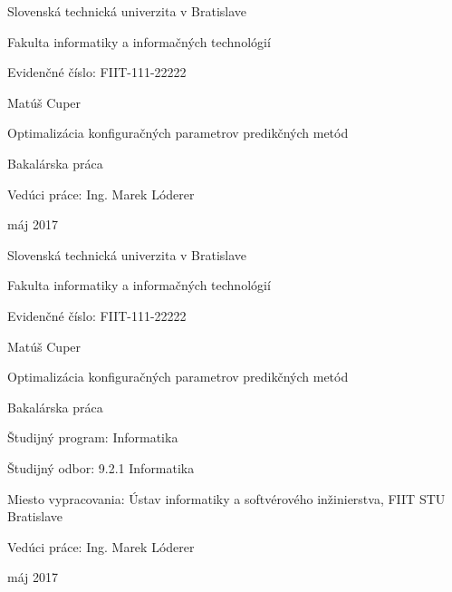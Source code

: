 \documentclass[a4paper,slovak,12pt,appendix]{article}
\begin{document}
\begin{titlepage}
	\centering
	{\Large Slovenská technická univerzita v Bratislave \par}
	{\Large Fakulta informatiky a informačných technológií \par}
  \vspace{0.5cm}
  {\normalsize Evidenčné číslo: FIIT-111-22222 \par}
	\vspace{7cm}
  {\large Matúš Cuper \par}
  \vspace{0.5cm}
	{\LARGE Optimalizácia konfiguračných parametrov predikčných metód \par}
	\vspace{0.5cm}
	{\large Bakalárska práca \par}
	\vspace{7cm}
  \flushleft
	{\large Vedúci práce: Ing. Marek Lóderer \par}
  \vspace{0.5cm}
  {\large máj 2017 \par}
	\vfill
\end{titlepage}

\begin{titlepage}
	\centering
  {\Large Slovenská technická univerzita v Bratislave \par}
	{\Large Fakulta informatiky a informačných technológií \par}
  \vspace{0.5cm}
  {\normalsize Evidenčné číslo: FIIT-111-22222 \par}
	\vspace{7cm}
  {\large Matúš Cuper \par}
  \vspace{0.5cm}
	{\LARGE Optimalizácia konfiguračných parametrov predikčných metód \par}
	\vspace{0.5cm}
	{\large Bakalárska práca \\}
	\vspace{7cm}
  \flushleft
  {\normalsize Študijný program: Informatika \par}
	{\normalsize Študijný odbor: 9.2.1 Informatika \par}
	{\normalsize Miesto vypracovania: Ústav informatiky a softvérového inžinierstva, FIIT STU Bratislave \par}
	{\normalsize Vedúci práce: Ing. Marek Lóderer \par}
  \vspace{0.5cm}
  {\normalsize máj 2017 \par}
\end{titlepage}
\end{document}
